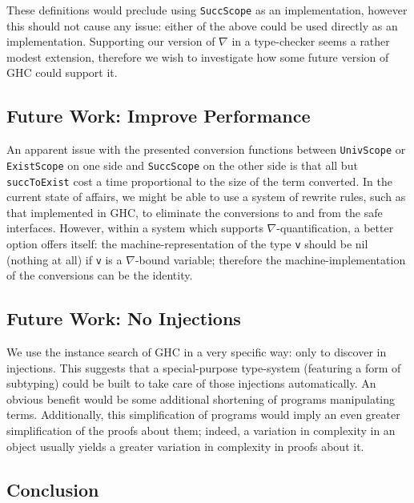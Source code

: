 \documentclass[9pt,authoryear]{sigplanconf}
\begin{document}
%
%


%
   These definitions would preclude using \texttt{SuccScope} as an implementation, 
   however this should not cause any issue{:} either of the above could be used directly
   as an implementation.
   Supporting our version of \texttt{\ensuremath{\nabla}} in a type-checker seems a rather modest extension,
   therefore we wish to investigate how some future version of GHC could support it.


\subsection{Future Work{:} Improve Performance}

%
An apparent issue with the presented conversion functions between
    \texttt{UnivScope} or \texttt{ExistScope} on one side and \texttt{SuccScope} on the
    other side is that all but \texttt{succToExist} cost a time 
    proportional to the size of the term converted. In the current state of affairs, we 
    might be able to use a system of rewrite rules, such as that implemented in GHC, to 
    eliminate the conversions to and from the safe interfaces. However, within
    a system which supports \ensuremath{\nabla}-quantification, a better option offers itself{:}
    the machine-representation of the type \texttt{v} should be
    nil (nothing at all) if \texttt{v} is a \ensuremath{\nabla}-bound variable; 
    therefore the machine-implementation of the conversions
    can be the identity.%


\subsection{Future Work{:} No Injections}

%
    We use the instance search of GHC in a very specific way{:} only to discover in injections.
    This suggests that a special-purpose type-system (featuring a form of subtyping)
    could be built to take care of those injections automatically.
    An obvious benefit would be some additional shortening of programs manipulating terms.
    Additionally, this simplification of programs would imply an
    even greater simplification of the proofs about them; indeed, a variation in complexity in
    an object usually yields a greater variation in complexity in proofs about it.


\subsection{Conclusion}
\end{document}
